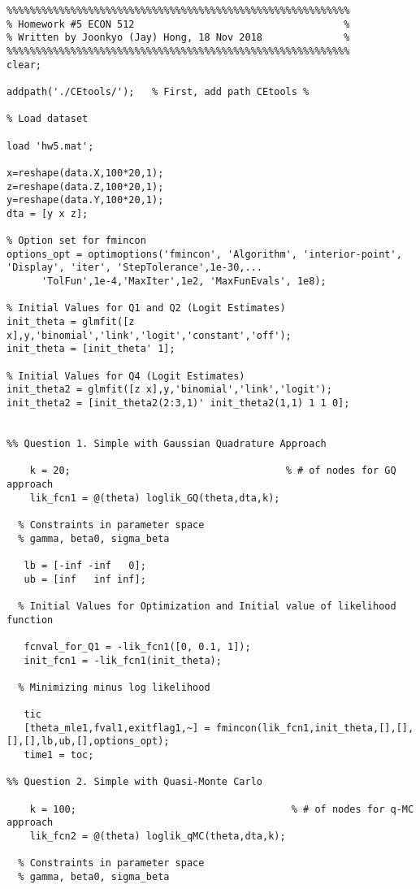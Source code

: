 \documentclass[10pt, letterpaper]{article}
\begin{document}
\begin{verbatim}
%%%%%%%%%%%%%%%%%%%%%%%%%%%%%%%%%%%%%%%%%%%%%%%%%%%%%%%%%%%
% Homework #5 ECON 512                                    %
% Written by Joonkyo (Jay) Hong, 18 Nov 2018              %
%%%%%%%%%%%%%%%%%%%%%%%%%%%%%%%%%%%%%%%%%%%%%%%%%%%%%%%%%%%
clear;

addpath('./CEtools/');   % First, add path CEtools %

% Load dataset

load 'hw5.mat';

x=reshape(data.X,100*20,1);
z=reshape(data.Z,100*20,1);
y=reshape(data.Y,100*20,1);
dta = [y x z];

% Option set for fmincon
options_opt = optimoptions('fmincon', 'Algorithm', 'interior-point', 'Display', 'iter', 'StepTolerance',1e-30,...
      'TolFun',1e-4,'MaxIter',1e2, 'MaxFunEvals', 1e8);
  
% Initial Values for Q1 and Q2 (Logit Estimates)
init_theta = glmfit([z x],y,'binomial','link','logit','constant','off');
init_theta = [init_theta' 1];

% Initial Values for Q4 (Logit Estimates)
init_theta2 = glmfit([z x],y,'binomial','link','logit');
init_theta2 = [init_theta2(2:3,1)' init_theta2(1,1) 1 1 0];


%% Question 1. Simple with Gaussian Quadrature Approach

    k = 20;                                     % # of nodes for GQ approach
    lik_fcn1 = @(theta) loglik_GQ(theta,dta,k);

  % Constraints in parameter space
  % gamma, beta0, sigma_beta

   lb = [-inf -inf   0];    
   ub = [inf   inf inf];

  % Initial Values for Optimization and Initial value of likelihood function
  
   fcnval_for_Q1 = -lik_fcn1([0, 0.1, 1]);
   init_fcn1 = -lik_fcn1(init_theta);
   
  % Minimizing minus log likelihood

   tic
   [theta_mle1,fval1,exitflag1,~] = fmincon(lik_fcn1,init_theta,[],[],[],[],lb,ub,[],options_opt);
   time1 = toc;

%% Question 2. Simple with Quasi-Monte Carlo

    k = 100;                                     % # of nodes for q-MC approach
    lik_fcn2 = @(theta) loglik_qMC(theta,dta,k);

  % Constraints in parameter space
  % gamma, beta0, sigma_beta


\end{verbatim}
\end{document}
